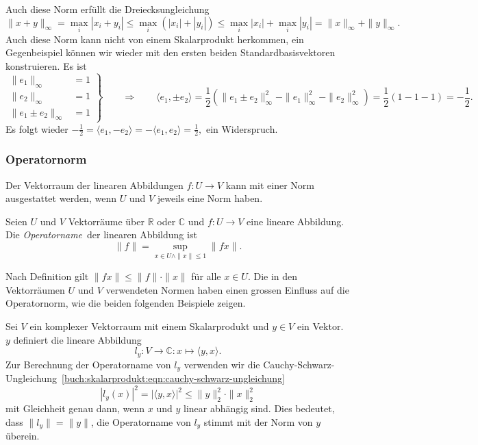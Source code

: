 Auch diese Norm  erfüllt die Dreiecksungleichung
\[
\|x+y\|_\infty
=
\max_i |x_i+y_i|
\le
\max_i (|x_i| + |y_i|)
\le
\max_i |x_i| + \max_i |y_i|
=
\|x\|_\infty + \|y\|_\infty.
\]
Auch diese Norm kann nicht von einem Skalarprodukt herkommen, ein
Gegenbeispiel können wir wieder mit den ersten beiden Standardbasisvektoren
konstruieren.
Es ist
\[
\left.
\begin{aligned}
\|e_1\|_\infty &= 1\\
\|e_2\|_\infty &= 1\\
\|e_1\pm e_2\|_\infty &= 1
\end{aligned}
\right\}
\qquad\Rightarrow\qquad
\langle e_1,\pm e_2\rangle
=
\frac12(\|e_1\pm e_2\|_\infty^2 - \|e_1\|_\infty^2 - \|e_2\|_\infty^2)
=
\frac12(1-1-1) = -\frac12.
\]
Es folgt wieder
\(
-\frac12
=
\langle e_1,-e_2\rangle
=
-\langle e_1,e_2\rangle
=
\frac12,
\)
ein Widerspruch.

\subsubsection{Operatornorm}
Der Vektorraum der linearen Abbildungen $f\colon U\to V$ kann mit einer
Norm ausgestattet werden, wenn $U$ und $V$ jeweils eine Norm haben.

\begin{definition}
Seien $U$ und $V$ Vektorräume über $\mathbb{R}$ oder $\mathbb{C}$ und
$f\colon U\to V$ eine lineare Abbildung.
Die {\em Operatorname} der linearen Abbildung ist 
%
\[
\|f\|
=
\sup_{x\in U\wedge \|x\|\le 1} \|fx\|.
\]
\end{definition}

Nach Definition gilt $\|fx\| \le \|f\|\cdot \|x\|$ für alle $x\in U$.
Die in den Vektorräumen $U$ und $V$ verwendeten Normen haben einen
grossen Einfluss auf die Operatornorm, wie die beiden folgenden
Beispiele zeigen.

\begin{beispiel}
Sei $V$ ein komplexer Vektorraum mit einem Skalarprodukt und $y\in V$ ein
Vektor.
$y$ definiert die lineare Abbildung
\[
l_y
\colon
V\to \mathbb{C}: x\mapsto \langle y,x\rangle.
\]
Zur Berechnung der Operatorname von $l_y$ verwenden wir die
Cauchy-Schwarz-Ungleichung~\eqref{buch:skalarprodukt:eqn:cauchy-schwarz-ungleichung}
\[
|l_y(x)|^2
=
|\langle y,x\rangle|^2
\le
\|y\|_2^2\cdot \|x\|_2^2
\]
mit Gleichheit genau dann, wenn $x$ und $y$ linear abhängig sind.
Dies bedeutet, dass
$\|l_y\|=\|y\|$, die Operatorname von $l_y$ stimmt mit der Norm von $y$
überein.
\end{beispiel}

